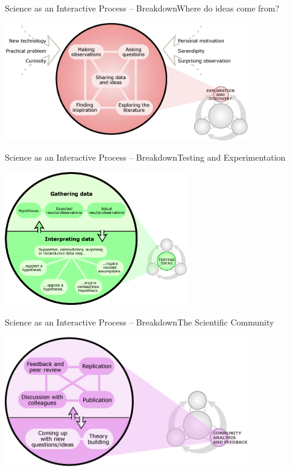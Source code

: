 \begin{frame}{Science as an Interactive Process -- Breakdown}{Where do ideas come from?}
  \begin{center}
    \includegraphics[width=0.8\textwidth]{../img/understandingscience_zoom1}
  \end{center}
\end{frame}

\begin{frame}{Science as an Interactive Process -- Breakdown}{Testing and Experimentation}
  \begin{center}
    \includegraphics[width=0.6\textwidth]{../img/understandingscience_zoom2}
  \end{center}
\end{frame}

\begin{frame}{Science as an Interactive Process -- Breakdown}{The Scientific Community}
  \begin{center}
    \includegraphics[width=0.8\textwidth]{../img/understandingscience_zoom3}
  \end{center}
\end{frame}


